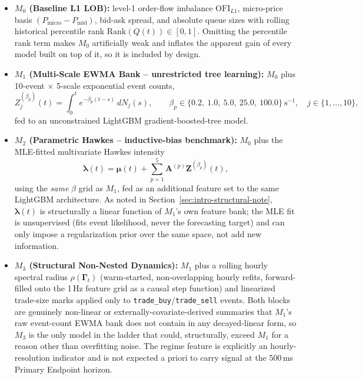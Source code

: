 \begin{itemize}[leftmargin=2em]
\item \textbf{$M_0$ (Baseline L1 LOB):} level-1 order-flow imbalance
  $\mathrm{OFI}_{L1}$, micro-price basis $(P_{\text{micro}} - P_{\text{mid}})$,
  bid-ask spread, and absolute queue sizes with rolling historical
  percentile rank $\mathrm{Rank}(Q(t)) \in [0,1]$. Omitting the percentile
  rank term makes $M_0$ artificially weak and inflates the apparent gain
  of every model built on top of it, so it is included by design.

\item \textbf{$M_1$ (Multi-Scale EWMA Bank -- unrestricted tree learning):}
  $M_0$ plus 10-event $\times$ 5-scale exponential event counts,
  \[
    Z_j^{(\beta_p)}(t) = \int_0^t e^{-\beta_p (t-s)}\,dN_j(s), \qquad
    \beta_p \in \{0.2,\ 1.0,\ 5.0,\ 25.0,\ 100.0\}\ \mathrm{s}^{-1}, \quad
    j \in \{1,\dots,10\},
  \]
  fed to an unconstrained LightGBM gradient-boosted-tree model.

\item \textbf{$M_2$ (Parametric Hawkes -- inductive-bias benchmark):}
  $M_0$ plus the MLE-fitted multivariate Hawkes intensity
  \[
    \boldsymbol{\lambda}(t) = \boldsymbol{\mu}(t) + \sum_{p=1}^{5} \mathbf{A}^{(p)} \mathbf{Z}^{(\beta_p)}(t),
  \]
  using the \emph{same} $\beta$ grid as $M_1$, fed as an additional
  feature set to the same LightGBM architecture. As noted in
  Section~\ref{sec:intro-structural-note}, $\boldsymbol{\lambda}(t)$ is
  structurally a linear function of $M_1$'s own feature bank; the MLE fit
  is unsupervised (fits event likelihood, never the forecasting target)
  and can only impose a regularization prior over the same space, not add
  new information.

\item \textbf{$M_3$ (Structural Non-Nested Dynamics):} $M_1$ plus a rolling
  hourly spectral radius $\rho(\boldsymbol{\Gamma}_t)$ (warm-started,
  non-overlapping hourly refits, forward-filled onto the 1\,Hz feature
  grid as a causal step function) and linearized trade-size marks applied
  only to \texttt{trade\_buy}/\texttt{trade\_sell} events. Both blocks are
  genuinely non-linear or externally-covariate-derived summaries that
  $M_1$'s raw event-count EWMA bank does not contain in any decayed-linear
  form, so $M_3$ is the only model in the ladder that could, structurally,
  exceed $M_1$ for a reason other than overfitting noise. The regime
  feature is explicitly an hourly-resolution indicator and is not expected
  a priori to carry signal at the 500\,ms Primary Endpoint horizon.
\end{itemize}

